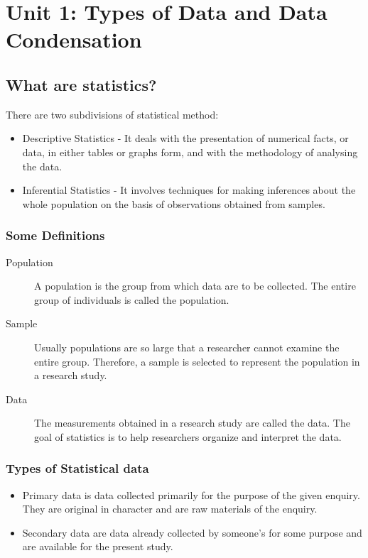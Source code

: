 \documentclass[
10pt, %
a4paper, %
]{report}
\begin{document}


\chapter{Unit 1: Types of Data and Data Condensation}



\section{What are statistics?}

There are two subdivisions of statistical method:
\begin{itemize}
\item Descriptive Statistics - It deals with the presentation of
numerical facts, or data, in either tables or graphs form,
and with the methodology of analysing the data.
\item Inferential Statistics - It involves techniques for making
inferences about the whole population on the basis of
observations obtained from samples.
\end{itemize}

\subsection{Some Definitions}
\begin{description}
\item[Population] A population is the group from which data are to be collected. The entire group of individuals is called the population.
\item[Sample] Usually populations are so large that a researcher cannot examine the entire group. Therefore, a sample is selected to represent the population in a research study.
\item[Data] The measurements obtained in a research study are called the data. The goal of statistics is to help researchers organize and interpret the data.
\end{description}

\subsection{Types of Statistical data}
\begin{itemize}
\item Primary data is data collected primarily for the purpose of
the given enquiry. They are original in character and are raw
materials of the enquiry.
\item Secondary data are data already collected by someone's for
some purpose and are available for the present study.
\end{itemize}
\end{document}
